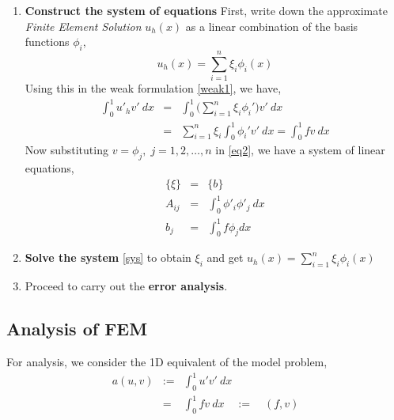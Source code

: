 \begin{enumerate}
	\item \textbf{Construct the system of equations}
	First, write down the approximate \emph{Finite Element Solution} $u_h(x)$ as a linear combination of the basis functions $\phi_i$,
	\begin{equation}
	u_h(x) = \sum_{i=1}^{n} \xi_i \phi_i(x)
	\end{equation}
	Using this in the weak formulation \ref{weak1}, we have,
	\begin{eqnarray}
	\int_{0}^{1} u'_hv' \ dx &=& \int_{0}^{1}  \bigg(\sum_{i=1}^{n} \xi_i \phi_i'\bigg) v' \ dx \label{weak2}\\	
	&=& \sum_{i=1}^{n} \xi_i \int_{0}^{1} \phi_i' v' \ dx = \int_{0}^{1} f v \ dx \label{eq2}
	\end{eqnarray}
	Now substituting $v = \phi_j, \; j=1,2,\dots, n $ in \ref{eq2}, we have a system of linear equations,
	\begin{eqnarray}
	[A]\{\xi\} &=& \{b\} \label{sys} \\ 
	A_{ij} &=& \int_{0}^{1} \phi'_i\phi'_j \ dx\\
	b_j &=& \int_{0}^{1} f\phi_j dx
	\end{eqnarray}
	
	\item \textbf{Solve the system} \ref{sys} to obtain $\xi_i$ and get $u_h(x) = \sum_{i=1}^{n} \xi_i \phi_i(x)$
	
	\item Proceed to carry out the \textbf{error analysis}.
\end{enumerate}



\subsection{Analysis of FEM}


For analysis, we consider the 1D equivalent of the model problem,
\begin{eqnarray}\nonumber
a(u,v) &:=& \int_{0}^{1} u' v'  \ dx\\ &=& \int_{0}^{1} fv \ dx \quad := \quad(f,v)
\end{eqnarray}

